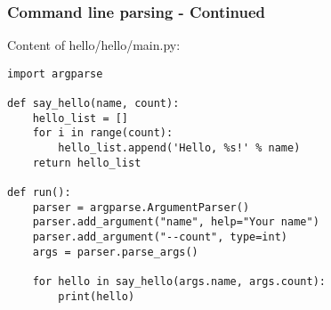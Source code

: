 \documentclass[12pt,handout]{beamer}
\begin{document}
\begin{frame}[fragile]
\frametitle{Command line parsing - Continued}

Content of hello/hello/main.py:

\small{
\begin{verbatim}
import argparse

def say_hello(name, count):
    hello_list = []
    for i in range(count):
        hello_list.append('Hello, %s!' % name)
    return hello_list

def run():
    parser = argparse.ArgumentParser()
    parser.add_argument("name", help="Your name")
    parser.add_argument("--count", type=int)
    args = parser.parse_args()

    for hello in say_hello(args.name, args.count):
        print(hello)

\end{verbatim}
}

\end{frame}
\end{document}
